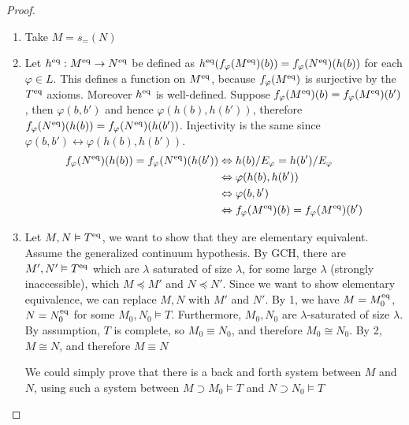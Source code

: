 \documentclass[11pt]{article}
\begin{document}
\begin{proof}
\begin{enumerate}
\item Take \(M=s_=(N)\)
\item Let \(h^{\operatorname{eq}}:M^{\operatorname{eq}}\to N^{\operatorname{eq}}\) be defined
as \(h^{\operatorname{eq}}(f_\varphi(M^{\operatorname{eq}})(b))=f_\varphi(N^{\operatorname{eq}})(h(b))\) for each \(\varphi\in L\). This defines a function
on \(M^{\operatorname{eq}}\), because \(f_\varphi(M^{\operatorname{eq}})\) is surjective by the \(T^{\operatorname{eq}}\) axioms.
Moreover \(h^{\operatorname{eq}}\) is well-defined. Suppose \(f_\varphi(M^{\operatorname{eq}})(b)=f_\varphi(M^{\operatorname{eq}})(b')\),
then \(\varphi(b,b')\) and hence \(\varphi(h(b),h(b'))\),
therefore \(f_\varphi(N^{\operatorname{eq}})(h(b))=f_\varphi(N^{\operatorname{eq}})(h(b'))\). Injectivity is the same
since \(\varphi(b,b')\leftrightarrow\varphi(h(b),h(b'))\).
\begin{align*}
f_\varphi(N^{\operatorname{eq}})(h(b))=f_\varphi(N^{\operatorname{eq}})(h(b'))&\Leftrightarrow h(b)/E_\varphi=h(b')/E_\varphi\\
&\Leftrightarrow\varphi(h(b),h(b'))\\
&\Leftrightarrow\varphi(b,b')\\
&\Leftrightarrow f_\varphi(M^{\operatorname{eq}})(b)=f_\varphi(M^{\operatorname{eq}})(b')
\end{align*}
\item Let \(M,N\vDash T^{\operatorname{eq}}\), we want to show that they are elementary equivalent. Assume the
generalized continuum hypothesis. By GCH, there are \(M',N'\vDash T^{\operatorname{eq}}\) which are \(\lambda\) saturated
of size \(\lambda\), for some large \(\lambda\) (strongly inaccessible), which \(M\preceq M'\) and \(N\preceq N'\). Since we
want to show elementary equivalence, we can replace \(M,N\) with \(M'\) and \(N'\). By 1, we
have \(M=M_0^{\operatorname{eq}}\), \(N=N_0^{\operatorname{eq}}\) for some \(M_0,N_0\vDash T\). Furthermore, \(M_0,N_0\)
are \(\lambda\)-saturated of size \(\lambda\). By assumption, \(T\) is complete, so \(M_0\equiv N_0\), and
therefore \(M_0\cong N_0\). By 2, \(M\cong N\), and therefore \(M\equiv N\)

We could simply prove that there is a back and forth system between \(M\) and \(N\), using
such a system between \(M\supset M_0\vDash T\) and \(N\supset N_0\vDash T\)
\label{Problem13}
\end{enumerate}
\end{proof}
\end{document}
